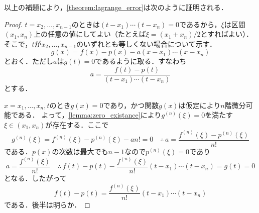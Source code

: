 \documentclass[a4paper]{ltjsarticle}
\theoremstyle{definition}
\begin{document}
以上の補題により，\cref{theorem:lagrange_error}は次のように証明される．

\begin{proof}
  $t=x_2,\dots,x_{n-1}$のときは$(t-x_1)\cdots (t-x_n)=0$であるから，$\xi$は区間$(x_1,x_n)$上の任意の値にしてよい（たとえば$\xi=(x_1+x_n)/2$とすればよい）．
  そこで，$t$が$x_2,\dots,x_{n-1}$のいずれとも等しくない場合について示す．
  \[
    g(x) = f(x)-p(x)-a(x-x_1)\cdots (x-x_n)
  \]
  とおく．ただし$a$は$g(t)=0$であるように取る．すなわち
  \[
    a = \frac{f(t)-p(t)}{(t-x_1)\cdots (t-x_n)}
  \]
  とする．

  $x=x_1,\dots,x_n,t$のとき$g(x)=0$であり，かつ関数$g(x)$は仮定により$n$階微分可能である．
  よって，\cref{lemma:zero_existance}により$g^{(n)}(\xi)=0$を満たす$\xi\in (x_1,x_n)$が存在する．ここで
  \[
    g^{(n)}(\xi) = f^{(n)}(\xi)-p^{(n)}(\xi)-an! = 0\quad\therefore\, a = \frac{f^{(n)}(\xi)-p^{(n)}(\xi)}{n!}
  \]
  である．$p(x)$の次数は最大でも$n-1$なので$p^{(n)}(\xi)=0$であり
  \[
    a = \frac{f^{(n)}(\xi)}{n!}
    \quad\therefore\, f(t)-p(t)-\frac{f^{(n)}(\xi)}{n!}(t-x_1)\cdots (t-x_n) = g(t) = 0
  \]
  となる．したがって
  \[
    f(t)-p(t) = \frac{f^{(n)}(\xi)}{n!}(t-x_1)\cdots (t-x_n)
  \]
  である．後半は明らか．
\end{proof}
\end{document}
